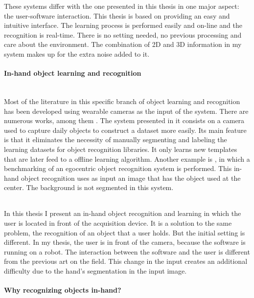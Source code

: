 These systems differ with the one presented in this thesis in one major aspect: 
the user-software interaction. 
This thesis is based on providing an easy and intuitive interface. 
The learning process is performed easily and on-line and the recognition is real-time. 
There is no setting needed, no previous processing and care about the environment. 
The combination of 2D and 3D information in my system makes up for the extra noise added to it.  



\paragraph{In-hand object learning and recognition}\mbox{}\\

Most of the literature in this specific branch of object learning and recognition has been developed using wearable cameras as the input of the system. 
There are numerous works, among them \cite{Roth2006}.
The system presented in it consists on a camera used to capture daily objects to construct a dataset more easily. 
Its main feature is that it eliminates the necessity of manually segmenting and labeling the learning datasets for object recognition libraries. 
It only learns new templates that are later feed to a offline learning algorithm. 
Another example is \cite{Philipose2009}, in which a benchmarking of an egocentric object recognition system is performed. 
This in-hand object recognition uses as input an image that has the object used at the center. 
The background is not segmented in this system. 

\\

In this thesis I present an in-hand object recognition and learning in which the user is located in front of the acquisition device. 
It is a solution to the same problem, the recognition of an object that a user holds. 
But the initial setting is different. 
In my thesis, the user is in front of the camera, because the software is running on a robot. 
The interaction between the software and the user is different from the previous art on the field. 
This change in the input creates an additional difficulty due to the hand's segmentation in the input image. 

\paragraph{Why recognizing objects in-hand?}\mbox{}\\

